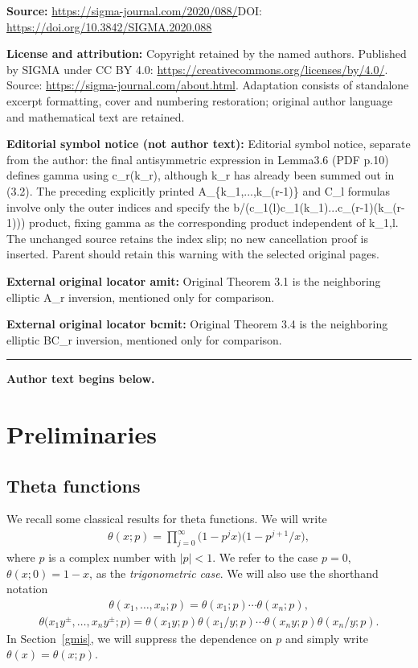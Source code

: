 \documentclass[11pt]{article}
\numberwithin{equation}{section}
\def\ta{\theta}
\begin{document}
\noindent\textbf{Source:} \url{https://sigma-journal.com/2020/088/}\quad DOI: \url{https://doi.org/10.3842/SIGMA.2020.088}\par
\noindent\textbf{License and attribution:} Copyright retained by the named authors. Published by SIGMA under CC BY 4.0: \url{https://creativecommons.org/licenses/by/4.0/}. Source: \url{https://sigma-journal.com/about.html}. Adaptation consists of standalone excerpt formatting, cover and numbering restoration; original author language and mathematical text are retained.\par
\noindent\textbf{Editorial symbol notice (not author text):} Editorial symbol notice, separate from the author: the final antisymmetric expression in Lemma3.6 (PDF p.10) defines gamma using c\_r(k\_r), although k\_r has already been summed out in (3.2). The preceding explicitly printed A\_\{k\_1,...,k\_(r-1)\} and C\_l formulas involve only the outer indices and specify the b/(c\_1(l)c\_1(k\_1)...c\_(r-1)(k\_(r-1))) product, fixing gamma as the corresponding product independent of k\_1,l. The unchanged source retains the index slip; no new cancellation proof is inserted. Parent should retain this warning with the selected original pages.\par
\noindent\textbf{External original locator amit:} Original Theorem 3.1 is the neighboring elliptic A\_r inversion, mentioned only for comparison.\par
\noindent\textbf{External original locator bcmit:} Original Theorem 3.4 is the neighboring elliptic BC\_r inversion, mentioned only for comparison.\par
\medskip\hrule\medskip\noindent\textbf{Author text begins below.}\par
\setcounter{section}{1}
\setcounter{subsection}{0}
\setcounter{subsubsection}{0}
\setcounter{Theorem}{0}
\setcounter{equation}{1}
\section{Preliminaries}

\subsection{Theta functions}

We recall some classical results for theta functions.
We will write
\begin{gather*}
\ta(x;p)=\prod\limits_{j=0}^\infty\big(1-p^jx\big)\big(1-p^{j+1}/x\big),
\end{gather*}
where $p$ is a complex number with $|p|<1$.
We refer to the case
 $p=0$, $\ta(x;0)=1-x$, as the \emph{trigonometric case}.
We will also use the shorthand notation
\begin{gather*}
\theta(x_1,\dots,x_n;p)=\ta(x_1;p)\dotsm\ta(x_n;p),
\end{gather*}
\begin{gather*}
\theta\big(x_1y^{\pm},\dots,x_ny^{\pm};p\big)=\ta(x_1y;p)\ta(x_1/y;p)\dotsm\ta(x_ny;p)
\ta(x_n/y;p).
\end{gather*}
In Section~\ref{gmis}, we will suppress the dependence on $p$ and simply write
$\theta(x)=\theta(x;p)$.
\end{document}
